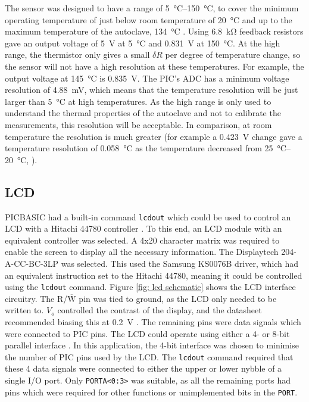 The sensor was designed to have a range of \SIrange{5}{150}{\celsius}, to cover the minimum operating temperature of just below room temperature of \SI{20}{\celsius} and up to the maximum temperature of the autoclave, \SI{134}{\celsius} \cite{nhs_autoclave}. Using \SI{6.8}{\kilo\ohm} feedback resistors gave an output voltage of \SI{5}{\volt} at \SI{5}{\celsius} and \SI{0.831}{\volt} at \SI{150}{\celsius}. At the high range, the thermistor only gives a small $\delta R$ per degree of temperature change, so the sensor will not have a high resolution at these temperatures. For example, the output voltage at \SI{145}{\celsius} is \SI{0.835}{\volt}. The PIC's ADC has a minimum voltage resolution of \SI{4.88}{\milli\volt}, which means that the temperature resolution will be just larger than \SI{5}{\celsius} at high temperatures. As the high range is only used to understand the thermal properties of the autoclave and not to calibrate the measurements, this resolution will be acceptable. In comparison, at room temperature the resolution is much greater (for example a \SI{0.423}{\volt} change gave a temperature resolution of \SI{0.058}{\celsius} as the temperature decreased from \SIrange{25}{20}{\celsius}, ).





\subsection{LCD}
PICBASIC had a built-in command \verb|lcdout| which could be used to control an LCD with a Hitachi 44780 controller \cite{picbasic_pro}. To this end, an LCD module with an equivalent controller was selected. A 4x20 character matrix was required to enable the screen to display all the necessary information. The Displaytech 204-A-CC-BC-3LP \cite{lcd} was selected. This used the Samsung KS0076B driver, which had an equivalent instruction set to the Hitachi 44780, meaning it could be controlled using the \verb|lcdout| command. Figure \ref{fig: lcd schematic} shows the LCD interface circuitry. The R/$\overline{\text{W}}$ pin was tied to ground, as the LCD only needed to be written to. $V_o$ controlled the contrast of the display, and the datasheet recommended biasing this at \SI{0.2}{\volt} \cite{lcd}. The remaining pins were data signals which were connected to PIC pins. The LCD could operate using either a 4- or 8-bit parallel interface \cite{picbasic_pro}. In this application, the 4-bit interface was chosen to minimise the number of PIC pins used by the LCD. The \verb|lcdout| command required that these 4 data signals were connected to either the upper or lower nybble of a single I/O port. Only \verb|PORTA<0:3>| was suitable, as all the remaining ports had pins which were required for other functions or unimplemented bits in the \verb|PORT|.\\

